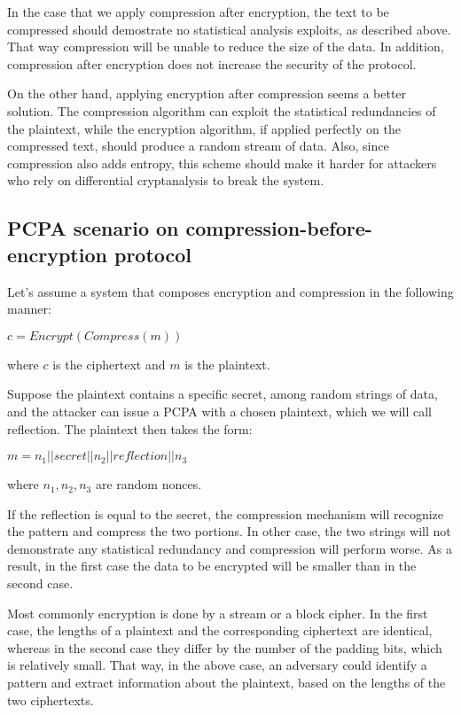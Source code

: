 In the case that we apply compression after encryption, the text to be
compressed should demostrate no statistical analysis exploits, as described
above. That way compression will be unable to reduce the size of the data. In
addition, compression after encryption does not increase the security of the
protocol.

On the other hand, applying encryption after compression seems a better
solution. The compression algorithm can exploit the statistical redundancies of
the plaintext, while the encryption algorithm, if applied perfectly on the
compressed text, should produce a random stream of data. Also, since compression
also adds entropy, this scheme should make it harder for attackers who rely on
differential cryptanalysis to break the system.

\subsection{PCPA scenario on compression-before-encryption protocol}

Let's assume a system that composes encryption and compression in the following
manner:

\begin{math}c = Encrypt(Compress(m))\end{math}

where \begin{math}c\end{math} is the ciphertext and \begin{math}m\end{math} is
the plaintext.

Suppose the plaintext contains a specific secret, among random strings of data,
and the attacker can issue a PCPA with a chosen plaintext, which we will call
reflection. The plaintext then takes the form:

\begin{math}m = n_1 || secret || n_2 || reflection || n_3\end{math}

where \begin{math}n_1, n_2, n_3\end{math} are random nonces.

If the reflection is equal to the secret, the compression mechanism will
recognize the pattern and compress the two portions. In other case, the two
strings will not demonstrate any statistical redundancy and compression will
perform worse. As a result, in the first case the data to be encrypted will be
smaller than in the second case.

Most commonly encryption is done by a stream or a block cipher. In the first
case, the lengths of a plaintext and the corresponding ciphertext are identical,
whereas in the second case they differ by the number of the padding bits, which
is relatively small. That way, in the above case, an adversary could identify a
pattern and extract information about the plaintext, based on the lengths of the
two ciphertexts.
